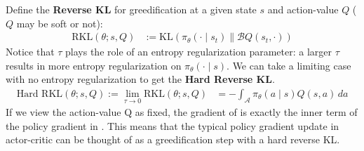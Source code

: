 \documentclass[twoside,11pt]{article}
\newcommand{\actionspace}{\mathcal{A}}
\newcommand{\Qhat}{{Q}}
\newcommand{\KL}{\mathrm{KL}}
\newcommand{\policyparams}{\theta}
\newcommand{\boltzmannQ}{\mathcal{B}Q}
\newcommand{\entropy}{\mathcal{H}}
\newcommand{\defeq}{:=}
\begin{document}
Define the \textbf{Reverse KL} for greedification at a given state $s$ and action-value $\Qhat$ ($\Qhat$ may be soft or not):%
%
\begin{align*}
 \text{RKL}(\policyparams; s, \Qhat) &\defeq \KL\left( \pi_\policyparams(\cdot \mid s_t) \parallel \boltzmannQ(s_t, \cdot) \right)%
\end{align*}
%
Notice that $\tau$ plays the role of an entropy regularization parameter: a larger $\tau$ results in more entropy regularization on $\pi_\policyparams(\cdot \mid s)$.
We can take a limiting case with no entropy regularization to get the \textbf{Hard Reverse KL}.
%
\begin{align}\label{eq:hard-reverse-KL}
    \text{Hard RKL}(\policyparams; s, \Qhat) \defeq \lim_{\tau \to 0} \text{RKL}(\policyparams; s, \Qhat) &= -\int_\actionspace \pi_\theta(a \mid s) Q(s, a)\, da
\end{align}
If we view the action-value Q as fixed, the gradient of  is exactly the inner term of the policy gradient in .
This means that the typical policy gradient update in actor-critic can be thought of as a greedification step with a hard reverse KL. %
\end{document}
